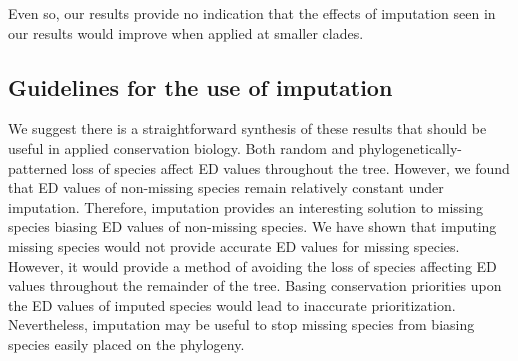 \documentclass[12pt,english]{article}
\begin{document}
Even so, our results provide no indication
that the effects of imputation seen in our results would improve when
applied at smaller clades.

\subsection*{Guidelines for the use of imputation}
We suggest there is a straightforward synthesis of these results that should be
useful in applied conservation biology. Both random and
phylogenetically-patterned loss of species affect ED values throughout the tree.
However, we found that ED values of non-missing species remain relatively
constant under imputation. Therefore, imputation provides an interesting
solution to missing species biasing ED values of non-missing species.
We have shown that imputing missing species would not provide accurate
ED values for missing species. However, it would provide a method of
avoiding the loss of species affecting ED values throughout the
remainder of the tree. Basing conservation priorities upon the ED
values of imputed species would lead to inaccurate
prioritization. Nevertheless, imputation may be useful to stop missing
species from biasing species easily placed on the phylogeny.
\end{document}
